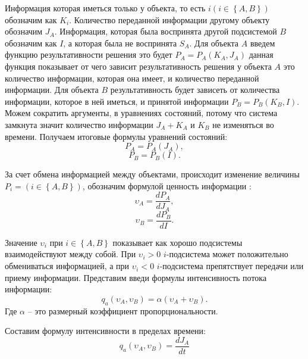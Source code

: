 Информация которая иметься только у объекта, то есть  $i \left( i \in \left\{A,B \right\} \right)$ обозначим как $K_i$. Количество переданной информации другому объекту обозначим $J_A$. Информация, которая была воспринята другой подсистемой $B$ обозначим как $I$, а которая была не воспринята $S_A$. Для объекта $A$ введем функцию результативности решения это будет $P_A=P_A(K_A,J_A)$ данная функция показывает от чего зависит результативность решения у объекта $A$ 	это количество информации, которая она имеет, и количество переданной информации. Для объекта $B$ результативность будет зависеть от количества информации, которое в ней иметься, и принятой информации $P_B=P_B(K_B,I)$. 
Можем сократить аргументы, в уравнениях состояний, потому что система замкнута значит количество информации $J_A+K_A$ и $K_B$ не изменяться во времени. Получаем итоговые формулы уравнений состояний:
\begin{equation}\label{eq:sost1}
P_A=P_A(J_A),
\end{equation}
\begin{equation}\label{eq:sost2}
P_B=P_B(I). 
\end{equation}

За счет обмена информацией между объектами, происходит изменение величины $P_i = \left( i \in \left\{A,B \right\} \right)$, обозначим формулой ценность информации :
\begin{equation}\label{eq:cenoostinfo1}
\upsilon_A = \frac{dP_A}{dJ_A},
\end{equation}
\begin{equation}\label{eq:cenoostinfo2}
\upsilon_B = \frac{dP_B	}{dI}.
\end{equation}

Значение $\upsilon_i$ при $i \in \left\{A,B \right\}$ показывает как хорошо подсистемы взаимодействуют между собой. При $\upsilon_i > 0$ $i$-подсистема может положительно обмениваться информацией, а при $\upsilon_i < 0$ $i$-подсистема препятствует передачи или приему информации. Представим введи формулы интенсивность потока информации:
\begin{equation}\label{eq:intensive}
q_a(\upsilon_A,\upsilon_B) = \alpha (\upsilon_A + \upsilon_B).
\end{equation}
Где $\alpha$ -- это размерный коэффициент пропорциональности.

Составим формулу интенсивности в пределах времени:
\begin{equation}\label{eq:intensiveA}
q_a(\upsilon_A,\upsilon_B) = \frac{dJ_A}{dt}
\end{equation}

